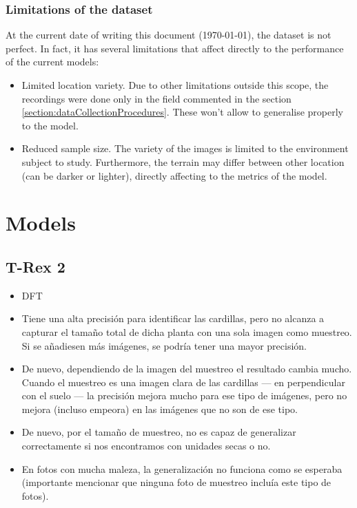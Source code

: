\documentclass[12pt]{report} %
\begin{document}
\subsection{Limitations of the dataset}
\label{subsec:dataLimits}

At the current date of writing this document (\today), the dataset is not perfect. In fact, it has several limitations that affect directly to the performance of the current models:

\begin{itemize}
	\item Limited location variety. Due to other limitations outside this scope, the recordings were done only in the field commented in the section \ref{section:dataCollectionProcedures}. These won't allow to generalise properly to the model.
	\item Reduced sample size. The variety of the images is limited to the environment subject to study. Furthermore, the terrain may differ between other location (can be darker or lighter), directly affecting to the metrics of the model.
\end{itemize}

\clearpage

\chapter{Models}
\section{T-Rex 2}
\begin{itemize}
	\item DFT
	\item Tiene una alta precisión para identificar las cardillas, pero no alcanza a capturar el tamaño total de dicha planta con una sola imagen como muestreo. Si se añadiesen más imágenes, se podría tener una mayor precisión.
	\item De nuevo, dependiendo de la imagen del muestreo el resultado cambia mucho. Cuando el muestreo es una imagen clara de las cardillas --- en perpendicular con el suelo --- la precisión mejora mucho para ese tipo de imágenes, pero no mejora (incluso empeora) en las imágenes que no son de ese tipo.
	\item De nuevo, por el tamaño de muestreo, no es capaz de generalizar correctamente si nos encontramos con unidades secas o no.
	\item En fotos con mucha maleza, la generalización no funciona como se esperaba (importante mencionar que ninguna foto de muestreo incluía este tipo de fotos).
\end{itemize}
\end{document}
